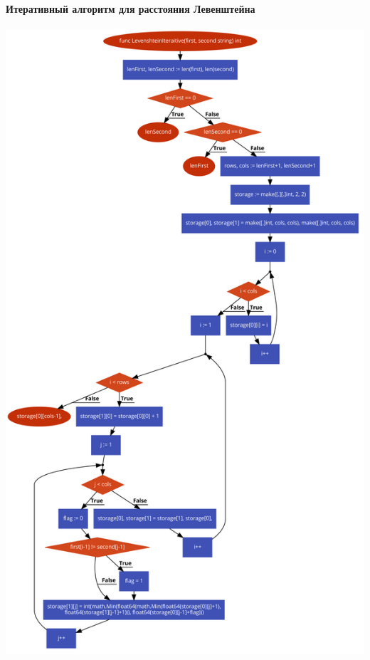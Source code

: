 \documentclass[utf8x, 12pt]{G7-32} %
\begin{document}
\newpage

\paragraph{Итеративный алгоритм для расстояния Левенштейна}
\begin{center}
	\includegraphics[scale=0.32]{images/levenshteinIterative.png}
\end{center}

\newpage
\end{document}
